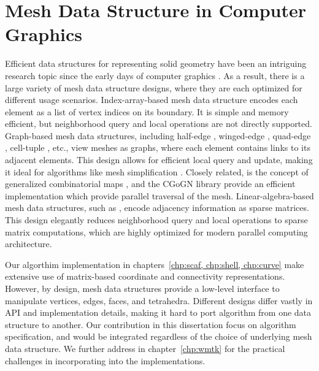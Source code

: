 \section{Mesh Data Structure in Computer Graphics}

Efficient data structures for representing solid geometry have been an intriguing
research topic since the early days of computer graphics \cite{Requicha1980}. As
a result, there is a large variety of mesh data structure designs, where they
are each optimized for different usage scenarios. Index-array-based mesh data
structure encodes each element as a list of vertex indices on its
boundary.  It is simple and memory efficient, but neighborhood query and local
operations are not directly supported.
Graph-based mesh data structures, including half-edge \cite{Maentylae1987},
winged-edge \cite{Baumgart1972}, quad-edge \cite{Guibas1985}, cell-tuple
\cite{Brisson1989}, etc., view meshes as graphs, where each element contains
links to its adjacent elements. This design allows for efficient local query
and update, making it ideal for algorithms like mesh simplification
\cite{garland1997surface}. 
{Closely related, is the concept of generalized combinatorial maps \cite{lienhardt1994n, dufourd1991obj3}, and the CGoGN library \cite{kraemer2014cgogn} provide an efficient implementation which provide parallel traversal of the mesh.}
Linear-algebra-based mesh data structures, such as
\cite{Dicarlo2014,Zayer2017,Mahmoud2021}, encode adjacency information as sparse
matrices.  This design elegantly reduces neighborhood query and local operations
to sparse matrix computations, which are highly optimized for modern parallel
computing architecture. 

%
Our algorthim implementation in chapters~\ref{chp:scaf, chp:shell, chp:curve} make extensive use of matrix-based coordinate and connectivity representations. 
However, by design, mesh data structures provide a low-level interface to
manipulate vertices, edges, faces, and tetrahedra.
Different designs differ vastly in API and implementation details, making it hard to port algorithm from one data structure to another. 
Our contribution in this dissertation focus on algorithm specification, and would be integrated regardless of the choice of underlying mesh data structure. We further address in chapter~\ref{chp:wmtk} for the practical challenges in incorporating into the implementations. 

